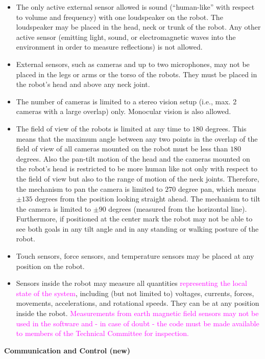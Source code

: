 \begin{itemize}
\item The only active external sensor allowed is sound
(``human-like'' with respect to volume and frequency) with one loudspeaker on the robot. The loudspeaker may be placed in the head, neck or trunk of the robot. Any
other active sensor (emitting light, sound, or electromagnetic waves into the environment in order to measure reflections) is not allowed. 
\item External sensors, such as cameras and up to two microphones, may not be placed in the legs or arms or the
torso of the robots. They must be placed in the robot's
head and above any neck joint. 
\item The number of cameras is limited to a stereo vision setup (i.e., max. 2 cameras with a large overlap) only. Monocular vision is also allowed.
\item The field of view of the robots is limited at any time to $180$ degrees. This means that the maximum angle between any two points in the overlap of the field of view of all cameras mounted on the robot must be less than $180$ degrees. Also the pan-tilt motion of the head and the cameras mounted on the robot's head is restricted to be more human like not only with respect to the field of view but also to the range of motion of the neck joints. Therefore, the mechanism to pan the camera is limited to $270$ degree pan, which means $\pm135$ degrees from the position looking straight ahead. The mechanism to tilt the camera is limited to $\pm90$ degrees (measured from the horizontal line). Furthermore, if positioned at the center mark the robot may not be able to see both goals in any tilt angle and in any standing or walking posture of the robot. 
\item Touch sensors, force sensors, and temperature sensors may be placed at any position on the robot.
\item Sensors inside the robot may measure all quantities \textcolor{magenta}{representing the local state of the system}, including (but not limited to) voltages, currents, forces, movements, accelerations, and rotational speeds. They can be at any position inside the robot. \textcolor{magenta}{Measurements from earth magnetic field sensors may not be used in the software and - in case of doubt - the code must be made available to members of the Technical Committee for inspection.}
\end{itemize}

{\bfseries Communication and Control (new)}

